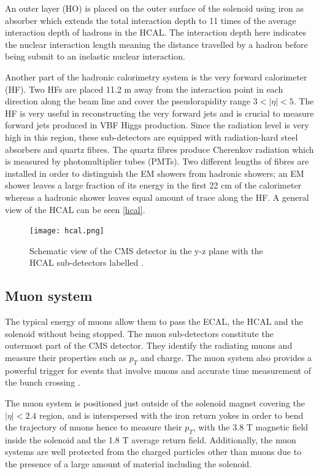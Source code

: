 An outer layer (HO) is placed on the outer surface of the solenoid using iron as absorber which extends the total interaction depth to 11 times of the average interaction depth of hadrons in the HCAL. The interaction depth here indicates the nuclear interaction length meaning the distance travelled by a hadron before being submit to an inelastic nuclear interaction.

Another part of the hadronic calorimetry system is the very forward calorimeter (HF). Two HFs are placed 11.2 m away from the interaction point in each direction along the beam line and cover the pseudorapidity range $3<|\eta|<5$. The HF is very useful in reconstructing the very forward jets and is crucial to measure forward jets produced in VBF Higgs production. Since the radiation level is very high in this region, these sub-detectors are equipped with radiation-hard steel absorbers and quartz fibres. The quartz fibres produce Cherenkov radiation which is measured by photomultiplier tubes (PMTs). Two different lengths of fibres are installed in order to distinguish the EM showers from hadronic showers; an EM shower leaves a large fraction of its energy in the first 22 cm of the calorimeter whereas a hadronic shower leaves equal amount of trace along the HF. A general view of the HCAL can be seen \autoref{hcal}.

\begin{figure}[ht]
	\centering
	\texttt{[image: hcal.png]}
	\vspace{2mm}
	\caption[Schematic view of the CMS detector in the y-z plane with the HCAL sub-detectors labelled.]{Schematic view of the CMS detector in the y-z plane with the HCAL sub-detectors labelled \cite{CMS-PHO-GEN-2012-002}.}
	\label{hcal}
\end{figure}

\subsection{Muon system}

The typical energy of muons allow them to pass the ECAL, the HCAL and the solenoid without being stopped. The muon sub-detectors constitute the outermost part of the CMS detector. They identify the radiating muons and measure their properties such as $p_T$ and charge. The muon system also provides a powerful trigger for events that involve muons and accurate time measurement of the bunch crossing \cite{Layter:343814}.

The muon system is positioned just outside of the solenoid magnet covering the $|\eta| < 2.4$ region, and is interspersed with the iron return yokes in order to bend the trajectory of muons hence to measure their $p_T$, with the 3.8 T magnetic field inside the solenoid and the 1.8 T average return field. Additionally, the muon systems are well protected from the charged particles other than muons due to the presence of a large amount of material including the solenoid.

